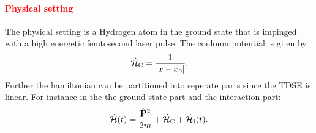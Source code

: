 \paragraph{\textcolor{red}{Physical setting}}
The physical setting is a Hydrogen atom in the ground state that is impinged with a high energetic femtosecond laser pulse. 
The coulomn potential is gi en by 
\begin{equation*}
    \hat{\mathcal{H}}_{\mathrm{C}}=\frac{1}{|x-x_0|}.
\end{equation*}
Further the hamiltonian can be partitioned into seperate parts since the TDSE is linear.
For instance in the the ground state part and the interaction part:
\begin{equation*}
    \hat{\mathcal{H}}(t) = \frac{\hat{\mathbf{P}}^2}{2m}+\hat{\mathcal{H}}_{\mathrm{C}} + \hat{\mathcal{H}}_{\mathrm{I}}(t).
\end{equation*}







